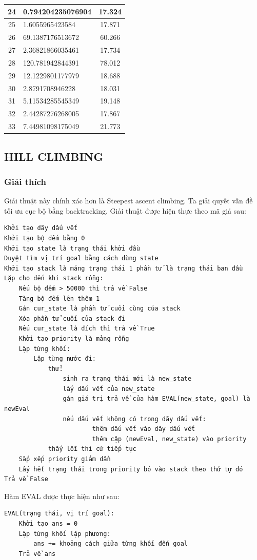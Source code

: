 \documentclass[a4paper, 11pt]{article}
\begin{document}
\begin{center}
\begin{tabular}{|c|l|c|}
		24       & 0.794204235076904 & 17.324       \\ \hline
		25       & 1.6055965423584   & 17.871       \\ \hline
		26       & 69.1387176513672  & 60.266       \\ \hline
		27       & 2.36821866035461  & 17.734       \\ \hline
		28       & 120.781942844391  & 78.012       \\ \hline
		29       & 12.1229801177979  & 18.688       \\ \hline
		30       & 2.8791708946228   & 18.031       \\ \hline
		31       & 5.11534285545349  & 19.148       \\ \hline
		32       & 2.44287276268005  & 17.867       \\ \hline
		33       & 7.44981098175049  & 21.773       \\ \hline
	\end{tabular}
\end{center}
\subsection{HILL CLIMBING}
\subsubsection{Giải thích}
Giải thuật này chính xác hơn là Steepest ascent climbing. Ta giải quyết vấn đề tối ưu cục bộ bằng
backtracking. Giải thuật được hiện thực theo mã giả sau:
\begin{verbatim}
Khởi tạo dãy dấu vết
Khởi tạo bộ đếm bằng 0
Khởi tạo state là trạng thái khởi đầu
Duyệt tìm vị trí goal bằng cách dùng state
Khởi tạo stack là mảng trạng thái 1 phần tử là trạng thái ban đầu
Lặp cho đến khi stack rỗng:
    Nếu bộ đếm > 50000 thì trả về False
    Tăng bộ đếm lên thêm 1
    Gán cur_state là phần tử cuối cùng của stack
    Xóa phần tử cuối của stack đi
    Nếu cur_state là đích thì trả về True
    Khởi tạo priority là mảng rỗng
    Lặp từng khối:
        Lặp từng nước đi:
            thử:
                sinh ra trạng thái mới là new_state
                lấy dấu vết của new_state
                gán giá trị trả về của hàm EVAL(new_state, goal) là newEval 
                nếu dấu vết không có trong dãy dấu vết:
                        thêm dấu vết vào dãy dấu vết
                        thêm cặp (newEval, new_state) vào priority
            thấy lỗi thì cứ tiếp tục
    Sắp xếp priority giảm dần
    Lấy hết trạng thái trong priority bỏ vào stack theo thứ tự đó
Trả về False
\end{verbatim}
Hàm EVAL được thực hiện như sau:
\begin{verbatim}
EVAL(trạng thái, vị trí goal):
    Khởi tạo ans = 0
    Lặp từng khối lập phương:
        ans += khoảng cách giữa từng khối đến goal
    Trả về ans
\end{verbatim}
\end{document}
